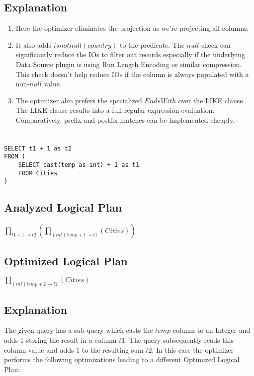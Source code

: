 \documentclass[12pt]{article}
\begin{document}
\subsection*{Explanation}

\begin{enumerate}


\item Here the optimizer eliminates the projection as we're projecting all columns. 

\item It also adds $isnotnull(country)$ to the predicate. The $null$ check can significantly reduce the IOs to filter out records especially if the underlying Data Source plugin is using Run Length Encoding or similar compression. This check doesn't help reduce IOs if the column is always populated with a non-$null$ value.

\item The optimizer also prefers the specialized $EndsWith$ over the LIKE clause. The LIKE clause results into a full regular expression evaluation. Comparatively, prefix and postfix matches can be implemented cheaply.
\end{enumerate}

\newpage

\section{}
\begin{verbatim}
SELECT t1 + 1 as t2
FROM (
    SELECT cast(temp as int) + 1 as t1
    FROM Cities
)
\end{verbatim}

\subsection*{Analyzed Logical Plan}
$\prod_{t1 + 1 \rightarrow t2} ( \prod_{(int)temp + 1 \rightarrow t1} (Cities) )$

\subsection*{Optimized Logical Plan}
$\prod_{(int)temp + 2 \rightarrow t2}(Cities)$

\subsection*{Explanation}

The given query has a sub-query which casts the $temp$ column to an Integer and adds 1 storing the result in a column $t1$. The query subsequently reads this column value and adds 1 to the resulting sum $t2$. In this case the optimizer performs the following optimizations leading to a different Optimized Logical Plan:
\end{document}
